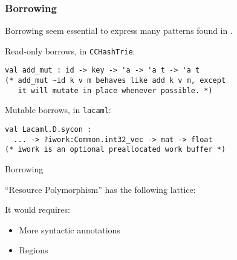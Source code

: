 \documentclass[xcolor=svgnames,11pt]{beamer}
\begin{document}
\begin{frame}
  \frametitle{Borrowing}

  Borrowing seem essential to express many patterns found in \ocaml.\pause

  Read-only borrows, in \texttt{CCHashTrie}:
\begin{lstlisting}
val add_mut : id -> key -> 'a -> 'a t -> 'a t
(* add_mut ~id k v m behaves like add k v m, except
   it will mutate in place whenever possible. *)
\end{lstlisting}
  \pause

  Mutable borrows, in \texttt{lacaml}:
\begin{lstlisting}
val Lacaml.D.sycon :
  ... -> ?iwork:Common.int32_vec -> mat -> float
(* iwork is an optional preallocated work buffer *)
\end{lstlisting}

\end{frame}

\begin{frame}[fragile]{Borrowing}

  ``Resource Polymorphism'' has the following lattice:
  \begin{center}
\end{center}
  It would requires:
  \begin{itemize}
  \item More syntactic annotations
  \item Regions
  \end{itemize}

\end{frame}
\end{document}
